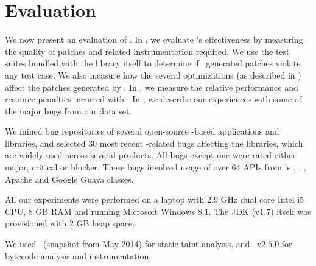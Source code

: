 \section{Evaluation}
\label{sec:results}

We now present an evaluation of \tool. In , we evaluate
\tool's effectiveness by measuring the quality of patches and related
instrumentation required. We use the test suites bundled with the library itself
to determine if \tool\ generated patches violate any test case. We also measure
how the several optimizations (as described in )
affect the patches generated by \tool. In , we measure the
relative performance and resource penalties incurred with \tool. In
, we describe our experiences with some of the major bugs
from our data set.


 We mined bug repositories of several open-source
\java-based applications and libraries, and selected $30$ most recent
-related bugs affecting the libraries, which are widely used across
several products. All bugs except one were rated either major, critical or
blocker. These bugs involved usage of over $64$ APIs from \java's
, , , Apache
 and Google Guava  classes.

 All our experiments were performed on a laptop
with $2.9$ GHz dual core Intel i$5$ CPU, $8$ GB RAM and running Microsoft
Windows $8.1$. The JDK (v$1.7$) itself was provisioned with $2$ GB heap space.
We used \infoflow\ (snapshot from May 2014)
for static taint analysis, and \soot\ v$2.5.0$ for bytecode analysis and
instrumentation.


